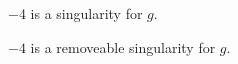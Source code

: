 \documentclass{ximera}
\begin{document}
\begin{exercise}
\begin{question}
\end{question}












\begin{question}


$-4$ is a singularity for $g$.

\begin{multipleChoice}
\end{multipleChoice}




$-4$ is a removeable singularity for $g$.

\begin{multipleChoice}
\end{multipleChoice}



\end{question}















\end{exercise}
\end{document}

